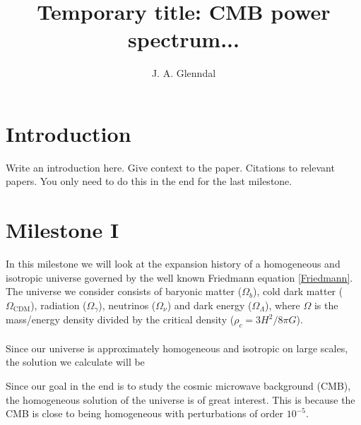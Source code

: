 \documentclass{aa}
\begin{document}
 

   \title{Temporary title: CMB power spectrum...}

   \author{J. A. Glenndal}


   \date{}



   \maketitle

\section{Introduction}
Write an introduction here. Give context to the paper. Citations to relevant papers. You only need to do this in the end for the last milestone.

\section{Milestone I}
In this milestone we will look at the expansion history of a homogeneous and isotropic universe governed by the well known Friedmann equation \ref{Friedmann}.
The universe we consider consists of baryonic matter ($\Omega_b$), cold dark matter ($\Omega_\mathrm{CDM}$), radiation ($\Omega_\gamma$), neutrinos ($\Omega_\nu$)
and dark energy ($\Omega_\Lambda$), where $\Omega$ is the mass/energy density divided by the critical density ($\rho_c = 3H^2/8\pi G$).\\
\\
Since our universe is approximately homogeneous and isotropic on large scales, the solution we calculate will be  



Since our goal in the end is to study the
cosmic microwave background (CMB), the homogeneous solution of the universe is of great interest. This is because the CMB is close to
being homogeneous with perturbations of order $10^{-5}$.
     
\end{document}
